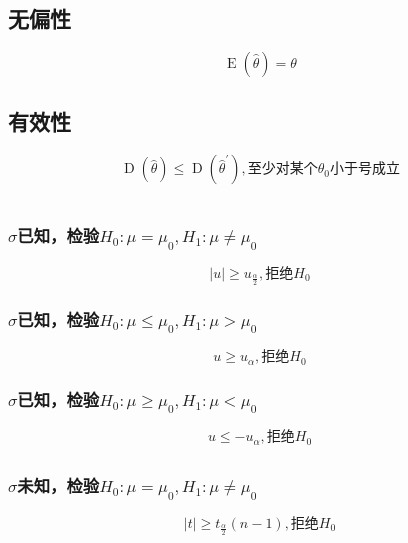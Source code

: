 \documentclass[]{article}
\numberwithin{equation}{section}
\DeclareMathOperator{\E}{E}
\DeclareMathOperator{\D}{D}
\begin{document}
\section{}
\subsection{无偏性}
\begin{equation}
    \E(\hat{\theta})=\theta
\end{equation}
\subsection{有效性}
\begin{equation}
    \D(\hat{\theta})\le\D(\hat{\theta}^{'}),\text{至少对某个}\theta_0\text{小于号成立}
\end{equation}

\newpage
\section{}
\subsection{}
\subsubsection{$\sigma$已知，检验$H_0:\mu=\mu_0,H_1:\mu\ne\mu_0$}
\begin{equation}
    \left|u\right|\ge u_\frac{\alpha}{2},\text{拒绝}H_0
\end{equation}
\subsubsection{$\sigma$已知，检验$H_0:\mu\le\mu_0,H_1:\mu>\mu_0$}
\begin{equation}
    u\ge u_\alpha,\text{拒绝}H_0
\end{equation}
\subsubsection{$\sigma$已知，检验$H_0:\mu\ge\mu_0,H_1:\mu<\mu_0$}
\begin{equation}
    u\le -u_\alpha,\text{拒绝}H_0
\end{equation}
\subsection{}
\subsubsection{$\sigma$未知，检验$H_0:\mu=\mu_0,H_1:\mu\ne\mu_0$}
\begin{equation}
    \left|t\right|\ge t_\frac{\alpha}{2}(n-1),\text{拒绝}H_0
\end{equation}
\end{document}
